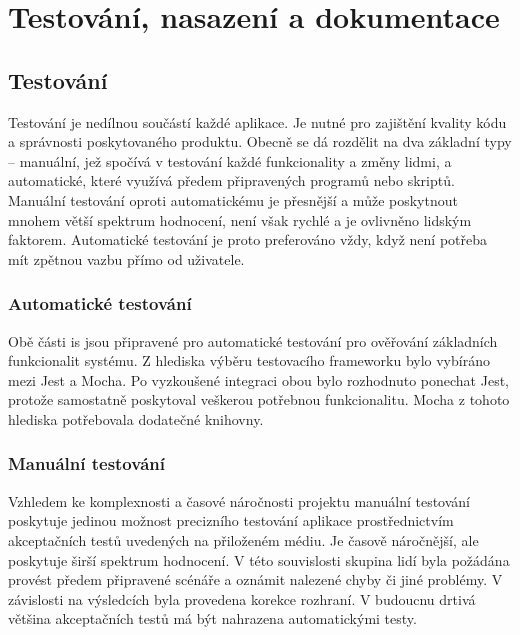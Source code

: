 \chapter{Testování, nasazení a dokumentace}




\section{Testování}

Testování je nedílnou součástí každé aplikace. Je nutné pro zajištění kvality kódu a správnosti poskytovaného produktu. Obecně se dá rozdělit na dva základní typy -- manuální, jež spočívá v testování každé funkcionality a změny lidmi, a automatické, které využívá předem připravených programů nebo skriptů. Manuální testování oproti automatickému je přesnější a může poskytnout mnohem větší spektrum hodnocení, není však rychlé a je ovlivněno lidským faktorem. Automatické testování je proto preferováno vždy, když není potřeba mít zpětnou vazbu přímo od uživatele.


\subsection{Automatické testování}

Obě části \gls{is} jsou připravené pro automatické testování pro ověřování základních funkcionalit systému. Z hlediska výběru testovacího frameworku bylo vybíráno mezi Jest a Mocha. Po vyzkoušené integraci obou bylo rozhodnuto ponechat Jest, protože samostatně poskytoval veškerou potřebnou funkcionalitu. Mocha z tohoto hlediska potřebovala dodatečné knihovny.


\subsection{Manuální testování}

Vzhledem ke komplexnosti a časové náročnosti projektu manuální testování poskytuje jedinou možnost precizního testování aplikace prostřednictvím akceptačních testů uvedených na přiloženém médiu. Je časově náročnější, ale poskytuje širší spektrum hodnocení. V této souvislosti skupina lidí byla požádána provést předem připravené scénáře a oznámit nalezené chyby či jiné problémy. V závislosti na výsledcích byla provedena korekce rozhraní. V budoucnu drtivá většina akceptačních testů má být nahrazena automatickými testy.


